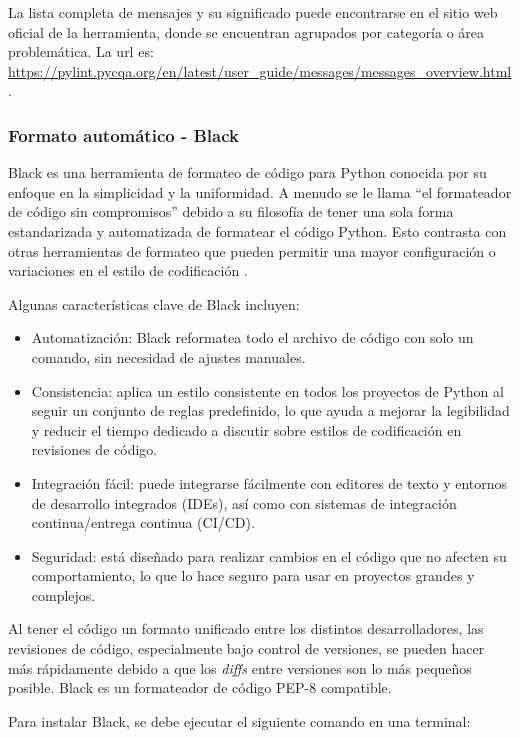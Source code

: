 La lista completa de mensajes y su significado puede encontrarse en el sitio web oficial de la herramienta, donde se encuentran agrupados por categoría o área problemática.  La url es: \small{\url{https://pylint.pycqa.org/en/latest/user_guide/messages/messages_overview.html}}.

\subsubsection{Formato automático - Black}

Black es una herramienta de formateo de código para Python conocida por su enfoque en la simplicidad y la uniformidad. A menudo se le llama ``el formateador de código sin compromisos'' debido a su filosofía de tener una sola forma estandarizada y automatizada de formatear el código Python. Esto contrasta con otras herramientas de formateo que pueden permitir una mayor configuración o variaciones en el estilo de codificación \citep{black}.

Algunas características clave de Black incluyen:

\begin{itemize}
    \item Automatización: Black reformatea todo el archivo de código con solo un comando, sin necesidad de ajustes manuales.
    \item Consistencia: aplica un estilo consistente en todos los proyectos de Python al seguir un conjunto de reglas predefinido, lo que ayuda a mejorar la legibilidad y reducir el tiempo dedicado a discutir sobre estilos de codificación en revisiones de código.
    \item Integración fácil: puede integrarse fácilmente con editores de texto y entornos de desarrollo integrados (IDEs), así como con sistemas de integración continua/entrega continua (CI/CD).
    \item Seguridad: está diseñado para realizar cambios en el código que no afecten su comportamiento, lo que lo hace seguro para usar en proyectos grandes y complejos.
\end{itemize}

Al tener el código un formato unificado entre los distintos desarrolladores, las revisiones de código, especialmente bajo control de versiones, se pueden hacer más rápidamente debido a que los \textit{diffs }entre versiones son lo más pequeños posible.  Black es un formateador de código PEP-8 compatible.

Para instalar Black, se debe ejecutar el siguiente comando en una terminal:

